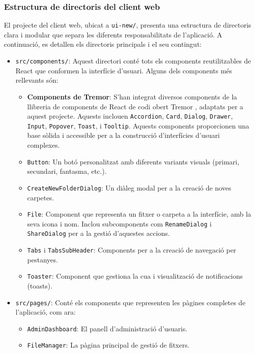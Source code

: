 \subsubsection{Estructura de directoris del client web}
El projecte del client web, ubicat a \texttt{ui-new/}, presenta una estructura de directoris clara i modular que separa les diferents responsabilitats de l'aplicació. A continuació, es detallen els directoris principals i el seu contingut:
\begin{itemize}
    \item \texttt{src/components/}: Aquest directori conté tots els components reutilitzables de React que conformen la interfície d'usuari. Alguns dels components més rellevants són:
    \begin{itemize}
        \item \textbf{Components de Tremor}: S'han integrat diversos components de la llibreria de components de React de codi obert Tremor \cite{tremor}, adaptats per a aquest projecte. Aquests inclouen \texttt{Accordion}, \texttt{Card}, \texttt{Dialog}, \texttt{Drawer}, \texttt{Input}, \texttt{Popover}, \texttt{Toast}, i \texttt{Tooltip}. Aquests components proporcionen una base sòlida i accessible per a la construcció d'interfícies d'usuari complexes.
        \item \texttt{Button}: Un botó personalitzat amb diferents variants visuals (primari, secundari, fantasma, etc.).
        \item \texttt{CreateNewFolderDialog}: Un diàleg modal per a la creació de noves carpetes.
        \item \texttt{File}: Component que representa un fitxer o carpeta a la interfície, amb la seva icona i nom. Inclou subcomponents com \texttt{RenameDialog} i \texttt{ShareDialog} per a la gestió d'aquestes accions.
        \item \texttt{Tabs} i \texttt{TabsSubHeader}: Components per a la creació de navegació per pestanyes.
        \item \texttt{Toaster}: Component que gestiona la cua i visualització de notificacions (toasts).
    \end{itemize}
    \item \texttt{src/pages/}: Conté els components que representen les pàgines completes de l'aplicació, com ara:
    \begin{itemize}
        \item \texttt{AdminDashboard}: El panell d'administració d'usuaris.
        \item \texttt{FileManager}: La pàgina principal de gestió de fitxers.

\end{itemize}
\end{itemize}
